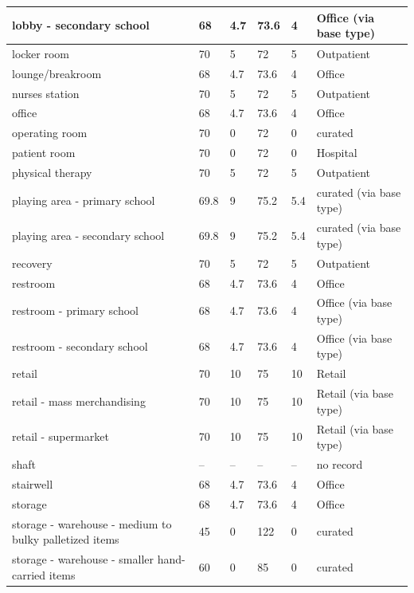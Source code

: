 \begin{center}
\begin{longtable}{|p{2.2in}|p{0.7in}|p{0.7in}|p{0.7in}|p{0.7in}|p{1.2in}|}
lobby - secondary school & 68 & 4.7 & 73.6 & 4 & Office (via base type) \\ \hline
locker room & 70 & 5 & 72 & 5 & Outpatient \\ \hline
lounge/breakroom & 68 & 4.7 & 73.6 & 4 & Office \\ \hline
nurses station & 70 & 5 & 72 & 5 & Outpatient \\ \hline
office & 68 & 4.7 & 73.6 & 4 & Office \\ \hline
operating room & 70 & 0 & 72 & 0 & curated \\ \hline
patient room & 70 & 0 & 72 & 0 & Hospital \\ \hline
physical therapy & 70 & 5 & 72 & 5 & Outpatient \\ \hline
playing area - primary school & 69.8 & 9 & 75.2 & 5.4 & curated (via base type) \\ \hline
playing area - secondary school & 69.8 & 9 & 75.2 & 5.4 & curated (via base type) \\ \hline
recovery & 70 & 5 & 72 & 5 & Outpatient \\ \hline
restroom & 68 & 4.7 & 73.6 & 4 & Office \\ \hline
restroom - primary school & 68 & 4.7 & 73.6 & 4 & Office (via base type) \\ \hline
restroom - secondary school & 68 & 4.7 & 73.6 & 4 & Office (via base type) \\ \hline
retail & 70 & 10 & 75 & 10 & Retail \\ \hline
retail - mass merchandising & 70 & 10 & 75 & 10 & Retail (via base type) \\ \hline
retail - supermarket & 70 & 10 & 75 & 10 & Retail (via base type) \\ \hline
shaft & -- & -- & -- & -- & no record \\ \hline
stairwell & 68 & 4.7 & 73.6 & 4 & Office \\ \hline
storage & 68 & 4.7 & 73.6 & 4 & Office \\ \hline
storage - warehouse - medium to bulky palletized items & 45 & 0 & 122 & 0 & curated \\ \hline
storage - warehouse - smaller hand-carried items & 60 & 0 & 85 & 0 & curated \\ \hline
\end{longtable}
\end{center}
